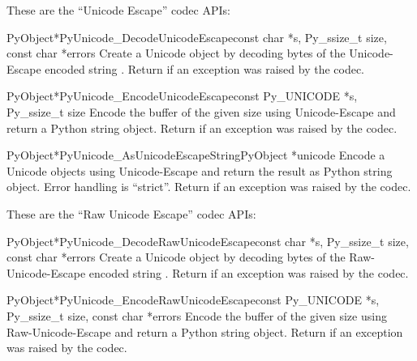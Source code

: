 
These are the ``Unicode Escape'' codec APIs:

\begin{cfuncdesc}{PyObject*}{PyUnicode_DecodeUnicodeEscape}{const char *s,
                                               Py_ssize_t size,
                                               const char *errors}
  Create a Unicode object by decoding  bytes of the
  Unicode-Escape encoded string .  Return \NULL{} if an
  exception was raised by the codec.
\end{cfuncdesc}

\begin{cfuncdesc}{PyObject*}{PyUnicode_EncodeUnicodeEscape}{const Py_UNICODE *s,
                                               Py_ssize_t size}
  Encode the  buffer of the given size using
  Unicode-Escape and return a Python string object.  Return \NULL{}
  if an exception was raised by the codec.
\end{cfuncdesc}

\begin{cfuncdesc}{PyObject*}{PyUnicode_AsUnicodeEscapeString}{PyObject *unicode}
  Encode a Unicode objects using Unicode-Escape and return the
  result as Python string object.  Error handling is ``strict''.
  Return \NULL{} if an exception was raised by the codec.
\end{cfuncdesc}


These are the ``Raw Unicode Escape'' codec APIs:

\begin{cfuncdesc}{PyObject*}{PyUnicode_DecodeRawUnicodeEscape}{const char *s,
                                               Py_ssize_t size,
                                               const char *errors}
  Create a Unicode object by decoding  bytes of the
  Raw-Unicode-Escape encoded string .  Return \NULL{} if an
  exception was raised by the codec.
\end{cfuncdesc}

\begin{cfuncdesc}{PyObject*}{PyUnicode_EncodeRawUnicodeEscape}{const Py_UNICODE *s,
                                               Py_ssize_t size,
                                               const char *errors}
  Encode the  buffer of the given size using
  Raw-Unicode-Escape and return a Python string object.  Return
  \NULL{} if an exception was raised by the codec.
\end{cfuncdesc}


